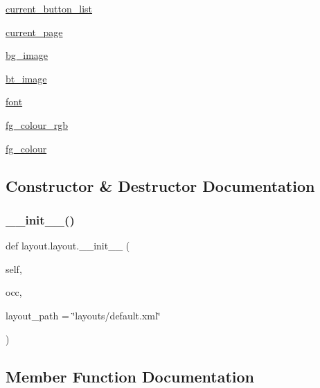 \begin{DoxyCompactItemize}
\item 
\hyperlink{classlayout_1_1layout_ae264b7570332c1e7d132b454483c12de}{current\+\_\+button\+\_\+list}
\item 
\hyperlink{classlayout_1_1layout_a1da959c61cfda61d0fbb6abc02f783e0}{current\+\_\+page}
\item 
\hyperlink{classlayout_1_1layout_a97f7b2c70908a32213c7c924abb7c298}{bg\+\_\+image}
\item 
\hyperlink{classlayout_1_1layout_a95ef146e9091ffb6a616ec1905b19a7d}{bt\+\_\+image}
\item 
\hyperlink{classlayout_1_1layout_a90ef9f3feda1913b0aca58e733f23f73}{font}
\item 
\hyperlink{classlayout_1_1layout_afae5a27bb85f620ea9a9d10d0da9495d}{fg\+\_\+colour\+\_\+rgb}
\item 
\hyperlink{classlayout_1_1layout_a6d811ee392218a0f440d4ac4db94a0ed}{fg\+\_\+colour}
\end{DoxyCompactItemize}


\subsection{Constructor \& Destructor Documentation}
\mbox{\label{classlayout_1_1layout_a7e47cd5d1e93a4b4515b1fb8a30941ec}} 
\subsubsection{\texorpdfstring{\+\_\+\+\_\+init\+\_\+\+\_\+()}{\_\_init\_\_()}}
{\footnotesize\ttfamily def layout.\+layout.\+\_\+\+\_\+init\+\_\+\+\_\+ (\begin{DoxyParamCaption}\item[{}]{self,  }\item[{}]{occ,  }\item[{}]{layout\+\_\+path = {\ttfamily \char`\"{}layouts/default.xml\char`\"{}} }\end{DoxyParamCaption})}



\subsection{Member Function Documentation}
\mbox{\label{classlayout_1_1layout_aadca21149875e45fbb0296dd7f20e7c5}} 

